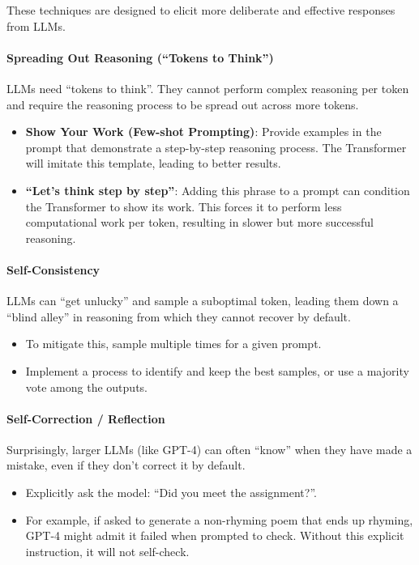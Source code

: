 These techniques are designed to elicit more deliberate and effective responses from LLMs.

\paragraph{Spreading Out Reasoning (``Tokens to Think'')}
LLMs need ``tokens to think''. They cannot perform complex reasoning per token and require the reasoning process to be spread out across more tokens.
\begin{itemize}
    \item \textbf{Show Your Work (Few-shot Prompting)}: Provide examples in the prompt that demonstrate a step-by-step reasoning process. The Transformer will imitate this template, leading to better results.
    \item \textbf{``Let's think step by step''}: Adding this phrase to a prompt can condition the Transformer to show its work. This forces it to perform less computational work per token, resulting in slower but more successful reasoning.
\end{itemize}

\paragraph{Self-Consistency}
LLMs can ``get unlucky'' and sample a suboptimal token, leading them down a ``blind alley'' in reasoning from which they cannot recover by default.
\begin{itemize}
    \item To mitigate this, sample multiple times for a given prompt.
    \item Implement a process to identify and keep the best samples, or use a majority vote among the outputs.
\end{itemize}

\paragraph{Self-Correction / Reflection}
Surprisingly, larger LLMs (like GPT-4) can often ``know'' when they have made a mistake, even if they don't correct it by default.
\begin{itemize}
    \item Explicitly ask the model: ``Did you meet the assignment?''.
    \item For example, if asked to generate a non-rhyming poem that ends up rhyming, GPT-4 might admit it failed when prompted to check. Without this explicit instruction, it will not self-check.
\end{itemize}


